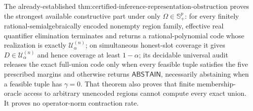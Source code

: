 The already-established \(\text{thm:certified-inference-representation-obstruction}\) proves the strongest available constructive part under only \(\Omega\in\mathbb S_+^p\): for every finitely rational-semialgebraically encoded nonempty region family, effective real quantifier elimination terminates and returns a rational-polynomial code whose realization is exactly \(\mathcal U^{(n)}_{\alpha}\); on simultaneous honest-slot coverage it gives \(D\in\mathcal U^{(n)}_{\alpha}\) and hence coverage at least \(1-\alpha\); its decidable universal audit releases the exact full-union code only when every feasible tuple satisfies the five prescribed margins and otherwise returns \(\mathsf{ABSTAIN}\), necessarily abstaining when a feasible tuple has \(\gamma=0\). That theorem also proves that finite membership-oracle access to arbitrary unencoded regions cannot compute every exact union. It proves no operator-norm contraction rate.